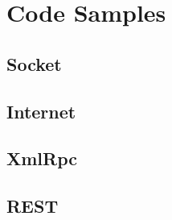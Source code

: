 \documentclass[10pt]{article}
\begin{document}
\newpage
\section{Code Samples}
\subsection{Socket}


\subsection{Internet}


\subsection{XmlRpc}


\subsection{REST}


\end{document}
